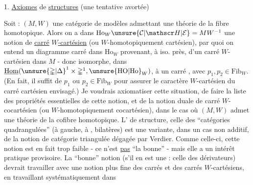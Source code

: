 
1. \uline{Axiomes} de \uline{structures} \uline{} (une tentative avortée)

Soit : $(M,W)$ une catégorie de modèles admettant une théorie de la fibre homotopique. Alors on a dans $\mathrm{Ho}_W\unsure{\mathcal C|\mathscr H|\mathcal E}=MW^{-1}$ une notion de \uline{carré} \uline{$W$-cartésien} (ou $W$-homotopiquement cartésien), par quoi on entend un diagramme carré
dans $\mathrm{Ho}_W$ provenant, à iso. près, d'un carré $W$-cartésien dans $M$ - donc  isomorphe, dans $\underline{\mathrm{Hom}}(\unsure{\mathbb{\Delta}|\Delta}^1\times\mathbb{\Delta}^1,\unsure{\mathrm{HO}|\mathrm{Ho}}_W)$, à un carré  
, avec $p_1,p_2\in\mathrm{Fib}_W$. (En fait, il suffit de $p_1$ ou $p_2\in\mathrm{Fib}_W$ pour assurer le caractère $W$-cartésien du carré cartésien envisagé.) Je voudrais axiomatiser
\margin{!}
cette situation,   de faire la liste des propriétés  essentielles de cette notion, et de la notion duale de carré $W$-cocartésien (ou $W$-homotopiquement cocartésien), dans le cas où $(M,W)$ admet une théorie de la cofibre homotopique. L' de structure,  celle des ``catégories quadrangulées'' (à gauche, à , bilatères) est une variante, dans un cas
non additif, de la notion de catégorie triangulée dégagée par Verdier. Comme celle-ci, cette notion est en fait trop faible - ce n'est \uline{pas} ``la bonne'' - mais elle a un intérêt pratique provisoire. La ``bonne'' notion (s'il en est une :  celle des dérivateurs) devrait travailler avec une notion plus fine des carrés et des carrés $W$-cartésiens, en travaillant systématiquement dans
